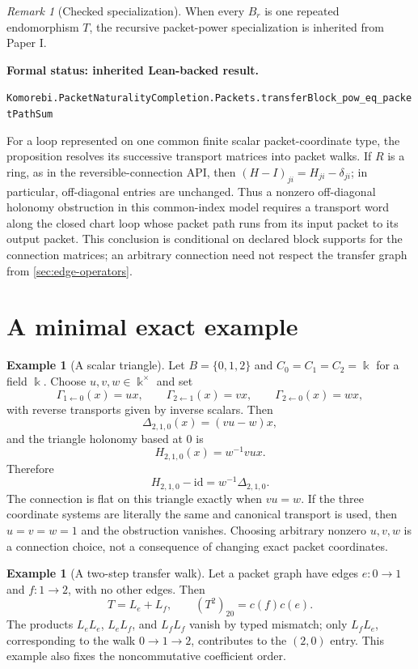 \documentclass[11pt]{article}
\theoremstyle{definition}
\newtheorem{example}[theorem]{Example}
\theoremstyle{remark}
\newtheorem{remark}[theorem]{Remark}
\newcommand{\bbk}{\Bbbk}
\newcommand{\id}{\mathrm{id}}
\newcommand{\leanname}[1]{\nolinkurl{#1}}
\newcommand{\statusleanprior}[1]{%
  \par\smallskip\noindent
  {\color{leanblue}\textbf{Formal status: inherited Lean-backed result.}}\par
  \begingroup\small\raggedright\leanname{#1}\par\endgroup\smallskip}
\begin{document}
\begin{remark}[Checked specialization]
When every $B_r$ is one repeated endomorphism $T$, the recursive packet-power
specialization is inherited from Paper I.
\end{remark}
\statusleanprior{Komorebi.PacketNaturalityCompletion.Packets.transferBlock_pow_eq_packetPathSum}

For a loop represented on one common finite scalar packet-coordinate type,
the proposition resolves its successive transport matrices into packet
walks.  If $R$ is a ring, as in the reversible-connection API, then
$(H-I)_{ji}=H_{ji}-\delta_{ji}$; in particular, off-diagonal entries are
unchanged.  Thus a nonzero off-diagonal holonomy obstruction in this
common-index model requires a transport word along the closed chart loop
whose packet path runs from its input packet to its output packet.  This
conclusion is conditional on declared block supports for the connection
matrices; an arbitrary connection need not respect the transfer graph from
\cref{sec:edge-operators}.

\section{A minimal exact example}
\label{sec:example}

\begin{example}[A scalar triangle]
Let $B=\{0,1,2\}$ and $C_0=C_1=C_2=\bbk$ for a field $\bbk$.  Choose
$u,v,w\in\bbk^\times$ and set
\[
\Gamma_{1\leftarrow0}(x)=ux,\qquad
\Gamma_{2\leftarrow1}(x)=vx,\qquad
\Gamma_{2\leftarrow0}(x)=wx,
\]
with reverse transports given by inverse scalars.  Then
\[
\Delta_{2,1,0}(x)=(vu-w)x,
\]
and the triangle holonomy based at $0$ is
\[
H_{2,1,0}(x)=w^{-1}vux.
\]
Therefore
\[
H_{2,1,0}-\id
=w^{-1}\Delta_{2,1,0}.
\]
The connection is flat on this triangle exactly when $vu=w$.  If the three
coordinate systems are literally the same and canonical transport is used,
then $u=v=w=1$ and the obstruction vanishes.  Choosing arbitrary nonzero
$u,v,w$ is a connection choice, not a consequence of changing exact packet
coordinates.
\end{example}

\begin{example}[A two-step transfer walk]
Let a packet graph have edges $e:0\to1$ and $f:1\to2$, with no other edges.
Then
\[
T=L_e+L_f,\qquad
(T^2)_{20}=c(f)c(e).
\]
The products $L_eL_e$, $L_eL_f$, and $L_fL_f$ vanish by typed mismatch;
only $L_fL_e$, corresponding to the walk $0\to1\to2$, contributes to the
$(2,0)$ entry.  This example also fixes the noncommutative coefficient order.
\end{example}
\end{document}
